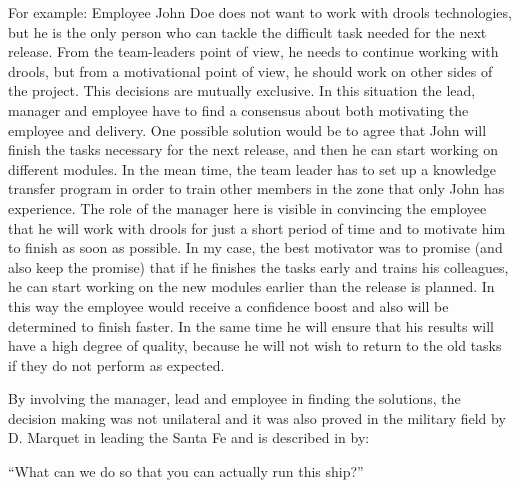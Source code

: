 For example: Employee John Doe does not want to work with drools technologies, but he is the only person who can tackle the difficult task needed for the next release. From the team-leaders point of view, he needs to continue working with drools, but from a motivational point of view, he should work on other sides of the project. This decisions are mutually exclusive. In this situation the lead, manager and employee have to find a consensus about both motivating the employee and delivery. One possible solution would be to agree that John will finish the tasks necessary for the next release, and then he can start working on different modules. In the mean time, the team leader has to set up a knowledge transfer program in order to train other members in the zone that only John has experience. The role of the manager here is visible in convincing the employee that he will work with drools for just a short period of time and to motivate him to finish as soon as possible. In my case, the best motivator was to promise (and also keep the promise) that if he finishes the tasks early and trains his colleagues, he can start working on the new modules earlier than the release is planned. In this way the employee would receive a confidence boost and also will be determined to finish faster. In the same time he will ensure that his results will have a high degree of quality, because he will not wish to return to the old tasks if they do not perform as expected.

By involving the manager, lead and employee in finding the solutions, the decision making was not unilateral and it was also proved in the military field by D. Marquet in leading the Santa Fe and is described in \cite{turn-that-ship-around} by:
\begin{displayquote}
``What can we do so that you can actually run this ship?''
\end{displayquote}
